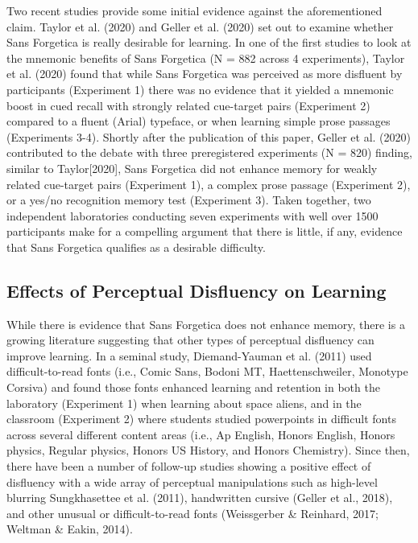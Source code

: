 \documentclass[
  english,
  jou]{apa7}
\begin{document}
Two recent studies provide some initial evidence against the aforementioned claim. Taylor et al. (2020) and Geller et al. (2020) set out to examine whether Sans Forgetica is really desirable for learning. In one of the first studies to look at the mnemonic benefits of Sans Forgetica (N = 882 across 4 experiments), Taylor et al. (2020) found that while Sans Forgetica was perceived as more disfluent by participants (Experiment 1) there was no evidence that it yielded a mnemonic boost in cued recall with strongly related cue-target pairs (Experiment 2) compared to a fluent (Arial) typeface, or when learning simple prose passages (Experiments 3-4). Shortly after the publication of this paper, Geller et al. (2020) contributed to the debate with three preregistered experiments (N = 820) finding, similar to Taylor{[}2020{]}, Sans Forgetica did not enhance memory for weakly related cue-target pairs (Experiment 1), a complex prose passage (Experiment 2), or a yes/no recognition memory test (Experiment 3). Taken together, two independent laboratories conducting seven experiments with well over 1500 participants make for a compelling argument that there is little, if any, evidence that Sans Forgetica qualifies as a desirable difficulty.

\hypertarget{effects-of-perceptual-disfluency-on-learning}{%
\subsection{Effects of Perceptual Disfluency on Learning}\label{effects-of-perceptual-disfluency-on-learning}}

While there is evidence that Sans Forgetica does not enhance memory, there is a growing literature suggesting that other types of perceptual disfluency can improve learning. In a seminal study, Diemand-Yauman et al. (2011) used difficult-to-read fonts (i.e., Comic Sans, Bodoni MT, Haettenschweiler, Monotype Corsiva) and found those fonts enhanced learning and retention in both the laboratory (Experiment 1) when learning about space aliens, and in the classroom (Experiment 2) where students studied powerpoints in difficult fonts across several different content areas (i.e., Ap English, Honors English, Honors physics, Regular physics, Honors US History, and Honors Chemistry). Since then, there have been a number of follow-up studies showing a positive effect of disfluency with a wide array of perceptual manipulations such as high-level blurring Sungkhasettee et al. (2011), handwritten cursive (Geller et al., 2018), and other unusual or difficult-to-read fonts (Weissgerber \& Reinhard, 2017; Weltman \& Eakin, 2014).
\end{document}
